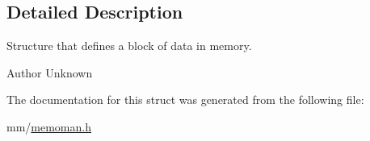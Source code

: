 \subsection{Detailed Description}
Structure that defines a block of data in memory. 

\begin{DoxyAuthor}{Author}
Unknown 
\end{DoxyAuthor}


The documentation for this struct was generated from the following file\+:\begin{DoxyCompactItemize}
\item 
mm/\hyperlink{memoman_8h}{memoman.\+h}\end{DoxyCompactItemize}
